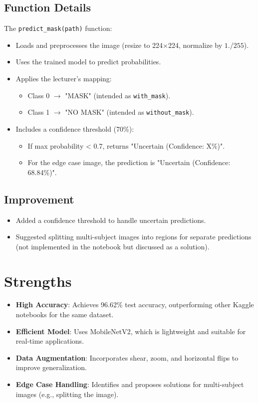 \documentclass[a4paper,12pt]{article}
\begin{document}
\subsection{Function Details}
The \texttt{predict\_mask(path)} function:
\begin{itemize}
    \item Loads and preprocesses the image (resize to 224$\times$224, normalize by $1./255$).
    \item Uses the trained model to predict probabilities.
    \item Applies the lecturer’s mapping:
        \begin{itemize}
            \item Class 0 $\rightarrow$ "MASK" (intended as \texttt{with\_mask}).
            \item Class 1 $\rightarrow$ "NO MASK" (intended as \texttt{without\_mask}).
        \end{itemize}
    \item Includes a confidence threshold (70\%):
        \begin{itemize}
            \item If max probability < 0.7, returns "Uncertain (Confidence: X\%)".
            \item For the edge case image, the prediction is "Uncertain (Confidence: 68.84\%)".
        \end{itemize}
\end{itemize}

\subsection{Improvement}
\begin{itemize}
    \item Added a confidence threshold to handle uncertain predictions.
    \item Suggested splitting multi-subject images into regions for separate predictions (not implemented in the notebook but discussed as a solution).
\end{itemize}

\section{Strengths}
\begin{itemize}
    \item \textbf{High Accuracy}: Achieves 96.62\% test accuracy, outperforming other Kaggle notebooks for the same dataset.
    \item \textbf{Efficient Model}: Uses MobileNetV2, which is lightweight and suitable for real-time applications.
    \item \textbf{Data Augmentation}: Incorporates shear, zoom, and horizontal flips to improve generalization.
    \item \textbf{Edge Case Handling}: Identifies and proposes solutions for multi-subject images (e.g., splitting the image).
\end{itemize}
\end{document}

